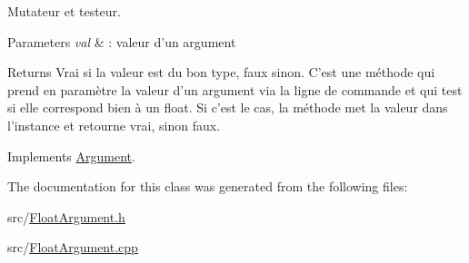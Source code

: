 Mutateur et testeur. 


\begin{DoxyParams}{Parameters}
{\em val} & \-: valeur d'un argument \\
\hline
\end{DoxyParams}
\begin{DoxyReturn}{Returns}
Vrai si la valeur est du bon type, faux sinon. C'est une méthode qui prend en paramètre la valeur d'un argument via la ligne de commande et qui test si elle correspond bien à un float. Si c'est le cas, la méthode met la valeur dans l'instance et retourne vrai, sinon faux. 
\end{DoxyReturn}


Implements \hyperlink{classArgument_a20b6a0182f1402dd36b20b1a6743e665}{Argument}.



The documentation for this class was generated from the following files\-:\begin{DoxyCompactItemize}
\item 
src/\hyperlink{FloatArgument_8h}{Float\-Argument.\-h}\item 
src/\hyperlink{FloatArgument_8cpp}{Float\-Argument.\-cpp}\end{DoxyCompactItemize}
